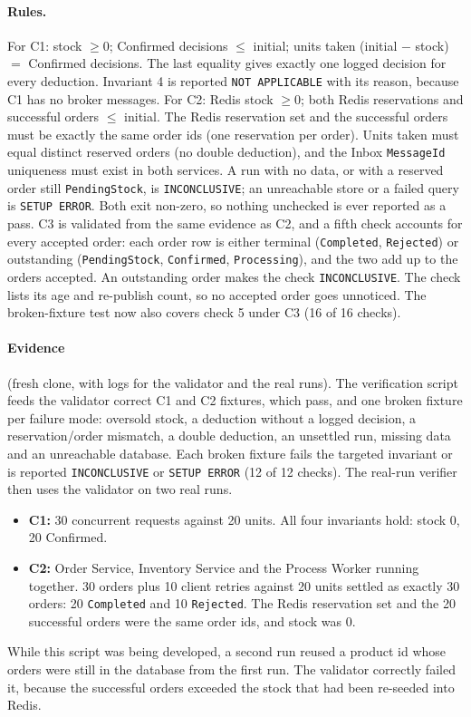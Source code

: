 \documentclass[a4paper]{report}
\begin{document}
\paragraph{Rules.} For C1: stock $\ge 0$; Confirmed decisions $\le$ initial;
units taken (initial $-$ stock) $=$ Confirmed decisions. The last equality
gives exactly one logged decision for every deduction. Invariant 4 is reported
\texttt{NOT
APPLICABLE} with its reason, because C1 has no broker messages. For C2: Redis
stock $\ge 0$; both Redis reservations and successful orders $\le$ initial.
The Redis reservation set and the successful orders must be exactly the same
order ids (one reservation per order). Units taken must equal distinct
reserved orders (no double deduction), and the Inbox \texttt{MessageId}
uniqueness must exist in both services. A run with no data, or with a reserved
order still \texttt{PendingStock}, is \texttt{INCONCLUSIVE}; an unreachable
store or a failed query is \texttt{SETUP ERROR}. Both exit non-zero, so
nothing unchecked is ever reported as a pass. C3 is validated from the
same evidence as C2, and a fifth check accounts for every accepted order: each
order row is either terminal (\texttt{Completed}, \texttt{Rejected}) or
outstanding (\texttt{PendingStock}, \texttt{Confirmed}, \texttt{Processing}),
and the two add up to the orders accepted. An outstanding order makes the
check \texttt{INCONCLUSIVE}. The check lists its age and re-publish count,
so no accepted order goes unnoticed. The broken-fixture test now also covers
check 5 under C3 (16 of 16 checks).

\sloppy\paragraph{Evidence} (fresh clone, with logs for the validator and the
real runs). The verification script feeds the validator correct C1 and C2
fixtures, which pass, and one broken fixture per failure mode: oversold
stock, a deduction without a logged decision, a reservation/order mismatch, a
double deduction, an unsettled run, missing data and an unreachable database.
Each broken fixture fails the targeted invariant or is reported
\texttt{INCONCLUSIVE} or \texttt{SETUP ERROR} (12 of 12 checks).
The real-run verifier then uses the validator on two real runs.
\begin{itemize}
  \item \textbf{C1:} 30 concurrent requests against 20 units. All four
    invariants hold: stock 0, 20 Confirmed.
  \item \textbf{C2:} Order Service, Inventory Service and the Process Worker
    running together. 30 orders plus 10 client retries against 20 units
    settled as exactly 30 orders: 20 \texttt{Completed} and 10
    \texttt{Rejected}. The Redis reservation set and the 20 successful orders
    were the same order ids, and stock was 0.
\end{itemize}\par
While this script was being developed, a second run reused a product id
whose orders were still in the database from the first run. The validator
correctly failed it, because the successful orders exceeded the stock that
had been re-seeded into Redis.
\end{document}
